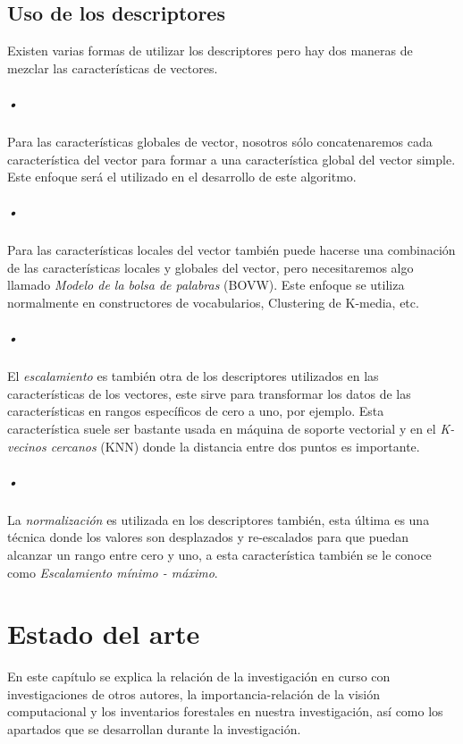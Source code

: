 \section{Uso de los descriptores}
Existen varias formas de utilizar los descriptores pero hay dos maneras de mezclar las características de vectores.

\paragraph{•} Para las características globales de vector, nosotros sólo concatenaremos cada característica del vector para formar a una característica global del vector simple. Este enfoque será el utilizado en el desarrollo de este algoritmo.

\paragraph{•} Para las características locales del vector también puede hacerse una combinación de las características locales y globales del vector, pero necesitaremos algo llamado \emph{Modelo de la bolsa de palabras} (BOVW). Este enfoque se utiliza normalmente en constructores de vocabularios, Clustering de K-media, etc.

\paragraph{•} El \emph{escalamiento} es también otra de los descriptores utilizados en las características de los vectores, este sirve para transformar los datos de las características en rangos específicos de cero a uno, por ejemplo. Esta característica suele ser bastante usada en máquina de soporte vectorial y en el \emph{K-vecinos cercanos} (KNN) donde la distancia entre dos puntos es importante.

\paragraph{•} La \emph{normalización} es utilizada en los descriptores también, esta última es una técnica donde los valores son desplazados y re-escalados  para que puedan alcanzar un rango entre cero y uno, a esta característica también se le conoce como \emph{Escalamiento mínimo - máximo}.

\chapter{Estado del arte}
En este capítulo se explica la relación de la investigación en curso con investigaciones de otros autores, la importancia-relación de la visión computacional y los inventarios forestales en nuestra investigación, así como los apartados que se desarrollan durante la investigación.

